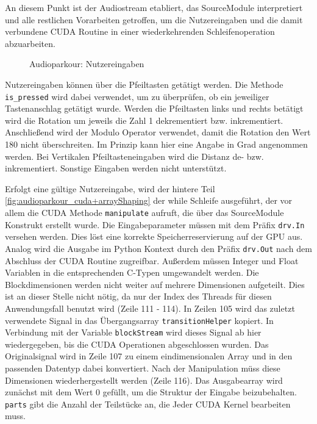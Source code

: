 An diesem Punkt ist der Audiostream etabliert, das SourceModule interpretiert und alle restlichen Vorarbeiten getroffen, um die Nutzereingaben und die damit verbundene CUDA Routine in einer wiederkehrenden Schleifenoperation abzuarbeiten. 

\begin{figure}[h!]
	
	\caption{Audioparkour: Nutzereingaben}
	\label{fig:audioparkour_userInput}
\end{figure}

Nutzereingaben können über die Pfeiltasten getätigt werden. Die Methode \texttt{is\_pressed} wird dabei verwendet, um zu überprüfen, ob ein jeweiliger Tastenanschlag getätigt wurde. Werden die Pfeiltasten links und rechts betätigt wird die Rotation um jeweils die Zahl 1 dekrementiert bzw. inkrementiert. Anschließend wird der Modulo Operator verwendet, damit die Rotation den Wert 180 nicht überschreiten. Im Prinzip kann hier eine Angabe in Grad angenommen werden.
Bei Vertikalen Pfeiltasteneingaben wird die Distanz de- bzw. inkrementiert. 
Sonstige Eingaben werden nicht unterstützt.

Erfolgt eine gültige Nutzereingabe, wird der hintere Teil \ref{fig:audioparkour_cuda+arrayShaping} der while Schleife ausgeführt, der vor allem die CUDA Methode \texttt{manipulate} aufruft, die über das SourceModule Konstrukt erstellt wurde. Die Eingabeparameter müssen mit dem Präfix \texttt{drv.In} versehen werden. Dies löst eine korrekte Speicherreservierung auf der GPU aus. Analog wird die Ausgabe im Python Kontext durch den Präfix \texttt{drv.Out} nach dem Abschluss der CUDA Routine zugreifbar. Außerdem müssen Integer und Float Variablen in die entsprechenden C-Typen umgewandelt werden. Die Blockdimensionen werden nicht weiter auf mehrere Dimensionen aufgeteilt. Dies ist an dieser Stelle nicht nötig, da nur der Index des Threads für diesen Anwendungsfall benutzt wird (Zeile 111 - 114). In Zeilen 105 wird das zuletzt verwendete Signal in das Übergangsarray \texttt{transitionHelper} kopiert. In Verbindung mit der Variable \texttt{blockStream} wird dieses Signal ab hier wiedergegeben, bis die CUDA Operationen abgeschlossen wurden. Das Originalsignal wird in Zeile 107 zu einem eindimensionalen Array und in den passenden Datentyp dabei konvertiert. Nach der Manipulation müss diese Dimensionen wiederhergestellt werden (Zeile 116). Das Ausgabearray wird zunächst mit dem Wert 0 gefüllt, um die Struktur der Eingabe beizubehalten. \texttt{parts} gibt die Anzahl der Teilstücke an, die Jeder CUDA Kernel bearbeiten muss. 

